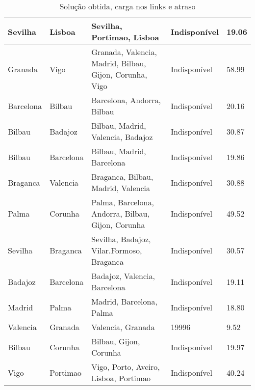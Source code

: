 \begin{table}[!htb]
{\begin{tabular}{|l|l|l|l|l|}
Sevilha & Lisboa & Sevilha, Portimao, Lisboa & Indisponível & 19.06 \\ \hline
Granada & Vigo & Granada, Valencia, Madrid, Bilbau, Gijon, Corunha, Vigo & Indisponível & 58.99 \\ \hline
Barcelona & Bilbau & Barcelona, Andorra, Bilbau & Indisponível & 20.16 \\ \hline
Bilbau & Badajoz & Bilbau, Madrid, Valencia, Badajoz & Indisponível & 30.87 \\ \hline
Bilbau & Barcelona & Bilbau, Madrid, Barcelona & Indisponível & 19.86 \\ \hline
Braganca & Valencia & Braganca, Bilbau, Madrid, Valencia & Indisponível & 30.88 \\ \hline
Palma & Corunha & Palma, Barcelona, Andorra, Bilbau, Gijon, Corunha & Indisponível & 49.52 \\ \hline
Sevilha & Braganca & Sevilha, Badajoz, Vilar.Formoso, Braganca & Indisponível & 30.57 \\ \hline
Badajoz & Barcelona & Badajoz, Valencia, Barcelona & Indisponível & 19.11 \\ \hline
Madrid & Palma & Madrid, Barcelona, Palma & Indisponível & 18.80 \\ \hline
Valencia & Granada & Valencia, Granada & 19996 & 9.52 \\ \hline
Bilbau & Corunha & Bilbau, Gijon, Corunha & Indisponível & 19.97 \\ \hline
Vigo & Portimao & Vigo, Porto, Aveiro, Lisboa, Portimao & Indisponível & 40.24 \\ \hline
\end{tabular}}
\caption[]{Solução obtida, carga nos links e atraso}
\end{table}

